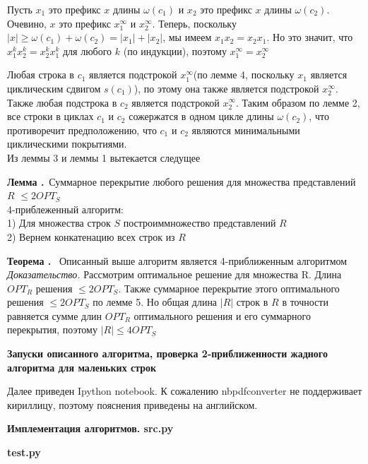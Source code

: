 \documentclass[11pt,a4paper]{article}
\newcommand\ifnonempty[2]{\ifthenelse{\equal{#1}{}}{}{#2}}
\newcounter{thm}
\newcounter{lem}
\newcommand{\thm}[1][]{\smallskip\par\hangafter=1\normalsize\textbf{Теорема \refstepcounter{thm}\thethm\ifnonempty{#1}{ (#1)}.}~}
\newcommand{\lem}[1][]{\smallskip\par\hangafter=1\normalsize\textbf{Лемма \refstepcounter{lem}\thelem\ifnonempty{#1}{ (#1)}.}~}
\begin{document}
Пусть $x_1$ это префикс $x$ длины $\omega(c_1)$ и $x_2$ это префикс $x$ длины $\omega(c_2)$. Очевино, $x$ это префикс $x_1^\infty$ и $x_2^\infty.$
Теперь, поскольку $|x| \ge \omega(c_1) + \omega(c_2) = |x_1| + |x_2|$, мы имеем $x_1 x_2 = x_2 x_1$. Но это значит, что $x_1^k x_2^k = x_2^k x_1^k$
для любого $k$ (по индукции), поэтому $x_1^\infty = x_2^\infty$
\par
Любая строка в $c_1$ является подстрокой $x_1^\infty$(по лемме 4, поскольку $x_1$ является циклическим сдвигом $s(c_1)$), по этому она также является
подстрокой $x_2^\infty$. Также любая подстрока в $c_2$ является подстрокой $x_2^\infty$. Таким образом по лемме 2, все строки в циклах $c_1$ и $c_2$
сожержатся в одном цикле длины $\omega(c_2)$, что противоречит предположению, что $c_1$ и $c_2$ являются минимальными циклическими покрытиями.
\\
Из леммы 3 и леммы 1 вытекается следущее

\lem Суммарное перекрытие любого решения для множества представлений $R$ $\le 2OPT_S$\\

4-приблеженный алгоритм:\\
1) Для множества строк $S$ построиммножество представлений $R$\\
2) Вернем конкатенацию всех строк из $R$\\
\thm
Описанный выше алгоритм является 4-приближенным алгоритмом \\
\textit{Доказательство.} Рассмотрим оптимальное решение для множества R. Длина $OPT_R$ решения $\le 2OPT_S$.
Также суммарное перекрытие этого оптимального решения $\le 2OPT_S$ по лемме 5. Но общая длина $|R|$ строк в $R$
в точности равняется сумме длин $OPT_R$ оптимального решения и его суммарного перекрытия, поэтому $|R| \le 4OPT_S$
\begin{center}
\Large
\textbf{Запуски описанного алгоритма, проверка 2-приближенности жадного алгоритма для маленьких строк}
\normalsize
\end{center}
Далее приведен Ipython notebook. К сожалению nbpdfconverter не поддерживает кириллицу, поэтому пояснения приведены на английском.


\begin{center}
\Large
\textbf{Имплементация алгоритмов. src.py}
\normalsize
\end{center}
\par
\lstset{
  caption=,
  basicstyle=\footnotesize, frame=tb,
  xleftmargin=-.0\textwidth, xrightmargin=.2\textwidth
}

\begin{center}
\Large
\textbf{test.py}
\normalsize
\end{center}

\end{document}

